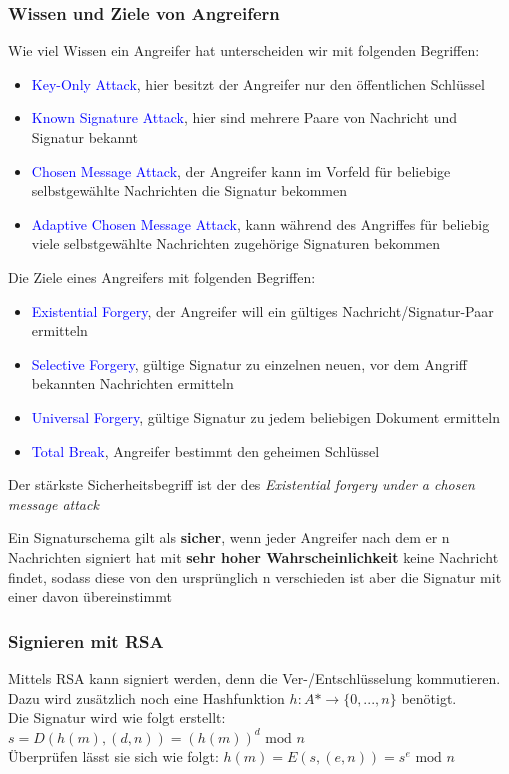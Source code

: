 \documentclass[a4paper,12pt,leqno]{article}
\newcommand{\blue}[1]{\textcolor{blue}{#1}}
\begin{document}
\subsubsection{Wissen und Ziele von Angreifern}
Wie viel Wissen ein Angreifer hat unterscheiden wir mit folgenden Begriffen:
\begin{itemize}
\item \blue{Key-Only Attack}, hier besitzt der Angreifer nur den öffentlichen Schlüssel
\item \blue{Known Signature Attack}, hier sind mehrere Paare von Nachricht und Signatur bekannt
\item \blue{Chosen Message Attack}, der Angreifer kann im Vorfeld für beliebige selbstgewählte Nachrichten die Signatur bekommen
\item \blue{Adaptive Chosen Message Attack}, kann während des Angriffes für beliebig viele selbstgewählte Nachrichten zugehörige Signaturen bekommen
\end{itemize}
Die Ziele eines Angreifers mit folgenden Begriffen:
\begin{itemize}
\item \blue{Existential Forgery}, der Angreifer will ein gültiges Nachricht/Signatur-Paar ermitteln
\item \blue{Selective Forgery}, gültige Signatur zu einzelnen neuen, vor dem Angriff bekannten Nachrichten ermitteln
\item \blue{Universal Forgery}, gültige Signatur zu jedem beliebigen Dokument ermitteln
\item \blue{Total Break}, Angreifer bestimmt den geheimen Schlüssel 
\end{itemize}

Der stärkste Sicherheitsbegriff ist der des \textit{Existential forgery under a chosen message attack}

Ein Signaturschema gilt als \textbf{sicher}, wenn jeder Angreifer nach dem er n Nachrichten signiert hat mit \textbf{sehr hoher Wahrscheinlichkeit} keine Nachricht findet, sodass diese von den ursprünglich n verschieden ist aber die Signatur mit einer davon übereinstimmt

\subsubsection{Signieren mit RSA}

Mittels RSA kann signiert werden, denn die Ver-/Entschlüsselung kommutieren. Dazu wird zusätzlich noch eine Hashfunktion $h: A*\rightarrow \{0,...,n\}$ benötigt.\\
Die Signatur wird wie folgt erstellt: $s=D(h(m),(d,n))=\left( h(m)\right)^d\textrm{ mod }n$\\
Überprüfen lässt sie sich wie folgt: $h(m)=E(s,(e,n))=s^e\textrm{ mod }n$\\
\end{document}
